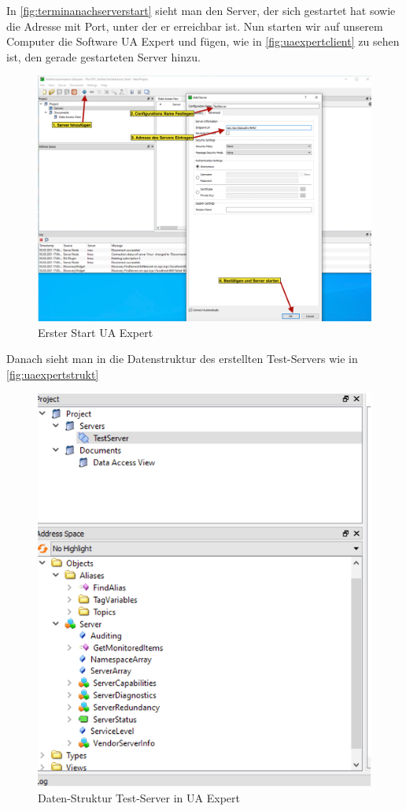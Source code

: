 In \autoref{fig:terminanachserverstart} sieht man den Server, der sich gestartet hat sowie die Adresse mit Port, unter der er erreichbar ist. Nun starten wir auf unserem Computer die Software UA Expert und fügen, wie in \autoref{fig:uaexpertclient} zu sehen ist, den gerade gestarteten Server hinzu. 

\begin{figure}[H]
	\centering
	\includegraphics[width=1\linewidth]{abb/UA_ExpertClient}
	\caption{Erster Start UA Expert}
	\label{fig:uaexpertclient}
\end{figure}

Danach sieht man in  die Datenstruktur des erstellten Test-Servers wie in \autoref{fig:uaexpertstrukt}

\begin{figure}[H]
	\centering
	\includegraphics[width=0.6\linewidth]{abb/UA_Expert_Strukt}
	\caption{Daten-Struktur Test-Server in UA Expert}
	\label{fig:uaexpertstrukt}
\end{figure}


